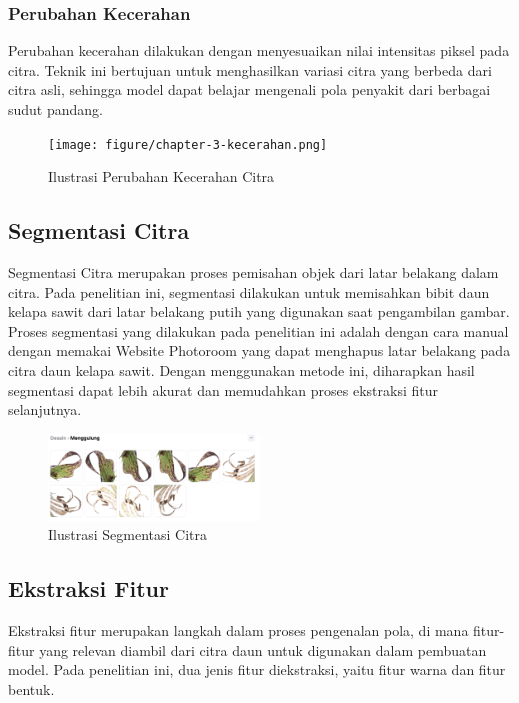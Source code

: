 \subsubsection{Perubahan Kecerahan} \label{III.Kecerahan}
Perubahan kecerahan dilakukan dengan menyesuaikan nilai intensitas piksel pada citra. Teknik ini bertujuan untuk menghasilkan variasi citra yang berbeda dari citra asli, sehingga model dapat belajar mengenali pola penyakit dari berbagai sudut pandang.
\begin{figure}[H]
	\centering
	\texttt{[image: figure/chapter-3-kecerahan.png]}
	\caption{Ilustrasi Perubahan Kecerahan Citra}
	\label{fig:3.Kecerahan}
\end{figure}

\subsection{Segmentasi Citra} \label{III.Segmentasi Citra}
Segmentasi Citra merupakan proses pemisahan objek dari latar belakang dalam citra. Pada penelitian ini, segmentasi dilakukan untuk memisahkan bibit daun kelapa sawit dari latar belakang putih yang digunakan saat pengambilan gambar. Proses segmentasi yang dilakukan pada penelitian ini adalah dengan cara manual dengan memakai Website Photoroom yang dapat menghapus latar belakang pada citra daun kelapa sawit. Dengan menggunakan metode ini, diharapkan hasil segmentasi dapat lebih akurat dan memudahkan proses ekstraksi fitur selanjutnya.
\begin{figure}[H]
	\centering
	\includegraphics[width=0.5\textwidth]{figure/chapter-3-segmentasi-citra.png}
	\caption{Ilustrasi Segmentasi Citra}
	\label{fig:3.Segmentasi Citra}
\end{figure}

\subsection{Ekstraksi Fitur} \label{III.Ekstraksi Fitur}
Ekstraksi fitur merupakan langkah dalam proses pengenalan pola, di mana fitur-fitur yang relevan diambil dari citra daun untuk digunakan dalam pembuatan model. Pada penelitian ini, dua jenis fitur diekstraksi, yaitu fitur warna dan fitur bentuk.

